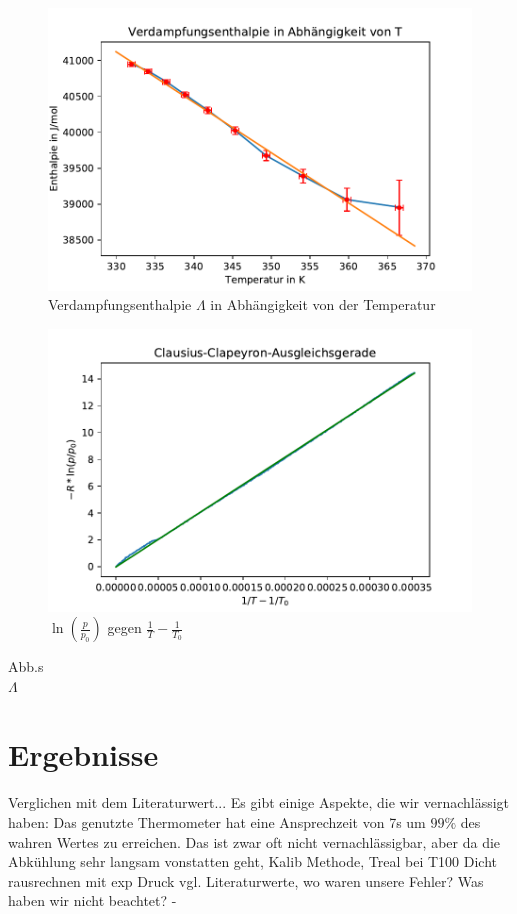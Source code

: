 \documentclass[]{article}
\begin{document}
\begin{figure}
	\begin{center}
		\includegraphics[scale=0.9]{Images/Dampfdruck_L.pdf}
		\caption{Verdampfungsenthalpie $\Lambda$ in Abhängigkeit von der Temperatur}
		\label{DD_L(T)}
	\end{center}
\end{figure}

\begin{figure}
	\begin{center}
		\includegraphics[scale=0.9]{Images/Dampfdruck_ln.pdf}
		\caption{$\ln(\frac{p}{p_0})$ gegen $\frac{1}{T} - \frac{1}{T_0}$}
		\label{DD_ln-1}
	\end{center}
\end{figure}

Abb.s\\
$\Lambda$\\ 
\section{Ergebnisse}
Verglichen mit dem Literaturwert...
Es gibt einige Aspekte, die wir vernachlässigt haben:
Das genutzte Thermometer hat eine Ansprechzeit von 7s um $99\%$ des wahren Wertes zu erreichen. Das ist zwar oft nicht vernachlässigbar, aber da die Abkühlung sehr langsam vonstatten geht, 
Kalib Methode, Treal bei T100
Dicht rausrechnen mit exp
Druck
vgl. Literaturwerte, wo waren unsere Fehler? Was haben wir nicht beachtet? - 
\end{document}
